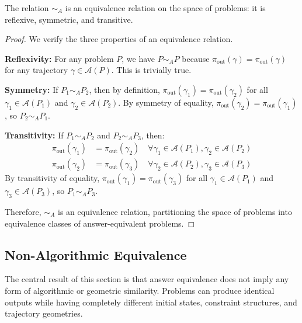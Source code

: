 \begin{proposition}
\label{prop:equiv_relation}
The relation $\sim_A$ is an equivalence relation on the space of problems: it is reflexive, symmetric, and transitive.
\end{proposition}

\begin{proof}
We verify the three properties of an equivalence relation.

\textbf{Reflexivity:} For any problem $P$, we have $P \sim_A P$ because $\pi_{\text{out}}(\gamma) = \pi_{\text{out}}(\gamma)$ for any trajectory $\gamma \in \mathcal{A}(P)$. This is trivially true.

\textbf{Symmetry:} If $P_1 \sim_A P_2$, then by definition, $\pi_{\text{out}}(\gamma_1) = \pi_{\text{out}}(\gamma_2)$ for all $\gamma_1 \in \mathcal{A}(P_1)$ and $\gamma_2 \in \mathcal{A}(P_2)$. By symmetry of equality, $\pi_{\text{out}}(\gamma_2) = \pi_{\text{out}}(\gamma_1)$, so $P_2 \sim_A P_1$.

\textbf{Transitivity:} If $P_1 \sim_A P_2$ and $P_2 \sim_A P_3$, then:
\begin{align}
\pi_{\text{out}}(\gamma_1) &= \pi_{\text{out}}(\gamma_2) \quad \forall \gamma_1 \in \mathcal{A}(P_1), \gamma_2 \in \mathcal{A}(P_2) \\
\pi_{\text{out}}(\gamma_2) &= \pi_{\text{out}}(\gamma_3) \quad \forall \gamma_2 \in \mathcal{A}(P_2), \gamma_3 \in \mathcal{A}(P_3)
\end{align}
By transitivity of equality, $\pi_{\text{out}}(\gamma_1) = \pi_{\text{out}}(\gamma_3)$ for all $\gamma_1 \in \mathcal{A}(P_1)$ and $\gamma_3 \in \mathcal{A}(P_3)$, so $P_1 \sim_A P_3$.

Therefore, $\sim_A$ is an equivalence relation, partitioning the space of problems into equivalence classes of answer-equivalent problems.
\end{proof}

\subsection{Non-Algorithmic Equivalence}

The central result of this section is that answer equivalence does not imply any form of algorithmic or geometric similarity. Problems can produce identical outputs while having completely different initial states, constraint structures, and trajectory geometries.

